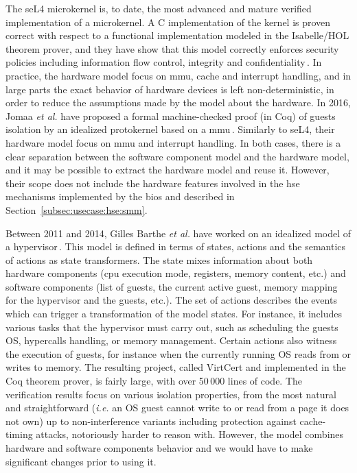 The seL4 microkernel  is, to date, the
most advanced and mature verified implementation of a microkernel.
%
A C implementation of the kernel is proven correct with respect to a functional
implementation modeled in the Isabelle/HOL theorem prover, and they  have show that this model correctly enforces security
policies including information flow control, integrity and
confidentiality\,\cite{klein2009sel4}.
%
In practice, the hardware model focus on \ac{mmu}, cache and interrupt handling,
and in large parts the exact behavior of hardware devices is left
non-deterministic, in order to reduce the assumptions made by the model about
the hardware.
%
In 2016, Jomaa \emph{et al.} have proposed a formal machine-checked proof (in
Coq) of guests isolation by an idealized protokernel based on a
\ac{mmu}\,\cite{jomaa2016mmu}.
%
Similarly to seL4, their hardware model focus on \ac{mmu} and interrupt
handling.
%
In both cases, there is a clear separation between the software component model
and the hardware model, and it may be possible to extract the hardware model and
reuse it.
%
However, their scope does not include the hardware features involved in the
\ac{hse} mechanisms implemented by the \ac{bios} and described in
Section~\ref{subsec:usecase:hse:smm}.

Between 2011 and 2014, Gilles Barthe \emph{et al.} have worked on an idealized
model of a
hypervisor\,\cite{barthe2011virtcert1,barthe2012virtcert2,barthe2014virtcert3}.
%
This model is defined in terms of states, actions and the semantics of actions
as state trans\-formers.
%
The state mixes information about both hardware components (\ac{cpu} execution
mode, registers, memory content, etc.) and software components (list of guests,
the current active guest, memory mapping for the hypervisor and the guests,
etc.).
%
The set of actions describes the events which can trigger a transformation of
the model states.
%
For instance, it includes various tasks that the hypervisor must carry out, such
as scheduling the guests OS, hypercalls handling, or memory management.
%
Certain actions also witness the execution of guests, for instance when the
currently running OS reads from or writes to memory.
%
The resulting project, called VirtCert and implemented in the Coq theorem
prover, is fairly large, with over 50\,000 lines of code.
%
The verification results focus on various isolation properties, from the most
natural and straightforward (\emph{i.e.} an OS guest cannot write to or read
from a page it does not own) up to non-interference variants including
protection against cache-timing attacks, notoriously harder to reason with.
%
However, the model combines hardware and software components behavior and we
would have to make significant changes prior to using it.

